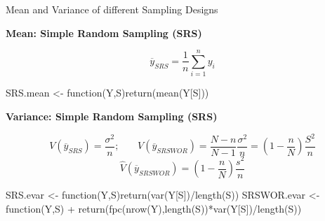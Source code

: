 \documentclass[11pt,german,hideothersubsections]{beamer}
\begin{document}
\begin{frame}[fragile]{Mean and Variance} {of different Sampling Designs}
\vspace{-.5cm}
\footnotesize{
\begin{center}
\textbf{Mean: Simple Random Sampling (SRS)}
\end{center}
\begin{equation*}
\overline{y}_{SRS}=\frac{1}{n}\sum_{i=1}^{n}y_i
\end{equation*}
}
\begin{Schunk}
\begin{Sinput}
 SRS.mean <- function(Y,S){return(mean(Y[S]))}
\end{Sinput}
\end{Schunk}
\footnotesize{
\begin{center}
\textbf{Variance: Simple Random Sampling (SRS)}
\end{center}
\begin{equation*}
V(\overline{y}_{SRS})=\frac{\sigma^2}{n}\text{; ~~~~ } V(\overline{y}_{SRSWOR})=\frac{N-n}{N-1}\frac{\sigma^2}{n}=(1-\frac{n}{N})\frac{S^2}{n}
\end{equation*}
\begin{equation*}
\hat{V}(\overline{y}_{SRSWOR})=(1-\frac{n}{N})\frac{s^2}{n}
\end{equation*}
\begin{Schunk}
\begin{Sinput}
 SRS.evar <- function(Y,S){return(var(Y[S])/length(S))}
 SRSWOR.evar <- function(Y,S)
+   {return(fpc(nrow(Y),length(S))*var(Y[S])/length(S))}
\end{Sinput}
\end{Schunk}
}
\end{frame}
\end{document}
